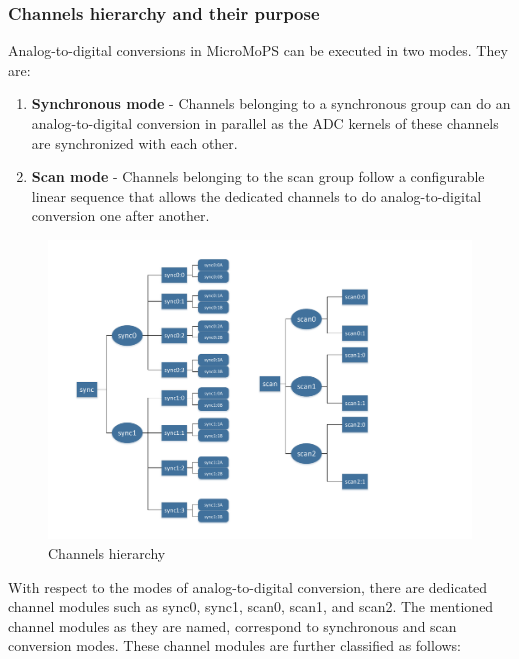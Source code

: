 \subsubsection{Channels hierarchy and their purpose}\label{sec:Channels}
Analog-to-digital conversions in MicroMoPS can be executed in two modes. They are:
\begin{enumerate}
\item \textbf{Synchronous mode} - Channels belonging to a synchronous group can do an analog-to-digital conversion in parallel as the ADC kernels of these channels are synchronized with each other.  
\item \textbf{Scan mode} - Channels belonging to the scan group follow a configurable linear sequence that allows the dedicated channels to do analog-to-digital conversion one after another.
\end{enumerate}
\begin{figure}[hbt]
		\centering
		\includegraphics[trim=0 0 50 0, clip, width=125mm, scale=0.75]{images/channels_hierarchy.pdf}
		\caption{Channels hierarchy}
		\label{Channels}
\end{figure}
With respect to the modes of analog-to-digital conversion, there are dedicated channel modules such as sync0, sync1, scan0, scan1, and scan2. The mentioned channel modules as they are named, correspond to synchronous and scan conversion modes. These channel modules are further classified as follows:
